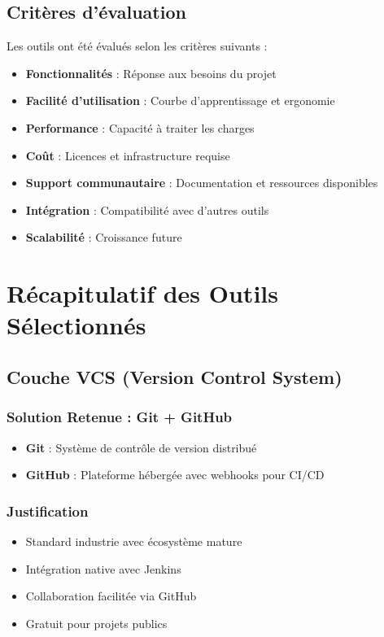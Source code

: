 \documentclass[12pt,a4paper]{report}
\begin{document}
\subsection{Critères d'évaluation}

Les outils ont été évalués selon les critères suivants :

\begin{itemize}
    \item \textbf{Fonctionnalités} : Réponse aux besoins du projet
    \item \textbf{Facilité d'utilisation} : Courbe d'apprentissage et ergonomie
    \item \textbf{Performance} : Capacité à traiter les charges
    \item \textbf{Coût} : Licences et infrastructure requise
    \item \textbf{Support communautaire} : Documentation et ressources disponibles
    \item \textbf{Intégration} : Compatibilité avec d'autres outils
    \item \textbf{Scalabilité} : Croissance future
\end{itemize}

\section{Récapitulatif des Outils Sélectionnés}

\subsection{Couche VCS (Version Control System)}

\subsubsection{Solution Retenue : Git + GitHub}

\begin{itemize}
    \item \textbf{Git} : Système de contrôle de version distribué
    \item \textbf{GitHub} : Plateforme hébergée avec webhooks pour CI/CD
\end{itemize}

\subsubsection{Justification}

\begin{itemize}
    \item Standard industrie avec écosystème mature
    \item Intégration native avec Jenkins
    \item Collaboration facilitée via GitHub
    \item Gratuit pour projets publics
\end{itemize}
\end{document}
